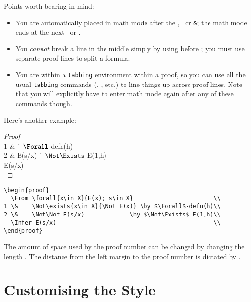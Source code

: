 \documentclass{article}
\newenvironment{dangerous}{\par\vspace{5pt}\bgroup\small\noindent}%
                          {\par\egroup\vspace{5pt}}
\renewcommand{\^}[1]{$\langle${\rm #1\/}$\rangle$}
\newcommand{\cs}[1]{\leavevmode\hbox{\tt \string#1}}
\begin{document}
Points worth bearing in mind:
\begin{itemize}
\item   You are automatically placed in math mode after the
        \cs\From, \cs\Infer\ or \cs\&; the math mode ends
        at the next \cs\by\ or \cs\\.
\item   You {\em cannot} break a line in the middle simply by using
        \cs\\ before \cs\by; you must use separate proof lines
        to split a formula.
\item   You are within a {\tt tabbing} environment within a proof, so
        you can use all the usual {\tt tabbing} commands (\cs\=,
        \cs\>, etc.) to line things up across proof lines.  Note
        that you will explicitly have to enter math mode again after
        any of these commands though.
\end{itemize}

Here's another example:

\begin{proof}
  \From {}   \\
1 \&    \Not{}  \` $\Forall$-defn(h)\\
2 \&    \Not\Not E(s/x) \` $\Not\Exists$-E(1,h)\\
  \Infer E(s/x)                         \\
\end{proof}
\begin{verbatim}
\begin{proof}
  \From \forall{x\in X}{E(x); s\in X}                       \\
1 \&    \Not\exists{x\in X}{\Not E(x)} \by $\Forall$-defn(h)\\
2 \&    \Not\Not E(s/x)             \by $\Not\Exists$-E(1,h)\\
  \Infer E(s/x)                                             \\
\end{proof}
\end{verbatim}

\begin{dangerous}
The amount of space used by the proof number can be changed by
changing the length \cs\ProofNumberWidth.  The distance from the
left margin to the proof number is dictated by \cs\ProofIndent.
\end{dangerous}


\section{Customising the Style}
\end{document}
